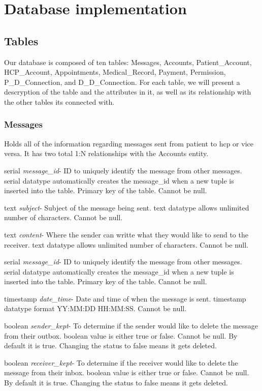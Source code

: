 \documentclass[12pt]{report}
\begin{document}
\section{Database implementation}
\subsection{Tables}
Our database is composed of ten tables: Messages, Accounts, Patient\_Account, HCP\_Account, Appointments, Medical\_Record, Payment, Permission, P\_D\_Connection, and D\_D\_Connection.  For each table, we will present a descryption of the table and the attributes in it, as well as its relationship with the other tables its connected with.

\subsubsection{Messages}
Holds all of the information regarding messages sent from patient to hcp or vice versa. It has two total 1:N relationships with the Accounts entity.

\begin{description}
\item serial \textit{message\_id}- ID to uniquely identify the message from other messages. serial datatype automatically creates the message\_id when a new tuple is inserted into the table.  Primary key of the table.  Cannot be null.
\item text \textit{subject}- Subject of the message being sent. text datatype allows unlimited number of characters.  Cannot be null.
\item text \textit{content}- Where the sender can writte what they would like to send to the receiver.  text datatype allows unlimited number of characters.  Cannot be null.
\item serial \textit{message\_id}- ID to uniquely identify the message from other messages. serial datatype automatically creates the message\_id when a new tuple is inserted into the table.  Primary key of the table.  Cannot be null.
\item timestamp \textit{date\_time}- Date and time of when the message is sent.  timestamp datatype format YY:MM:DD HH:MM:SS.  Cannot be null.
\item boolean \textit{sender\_kept}- To determine if the sender would like to delete the message from their outbox.  boolean value is either true or false.  Cannot be null.  By default it is true.  Changing the status to false means it gets deleted.
\item boolean \textit{receiver\_kept}- To determine if the receiver would like to delete the message from their inbox.  boolean value is either true or false.  Cannot be null.  By default it is true.  Changing the status to false means it gets deleted.
\end{description}
\end{document}
